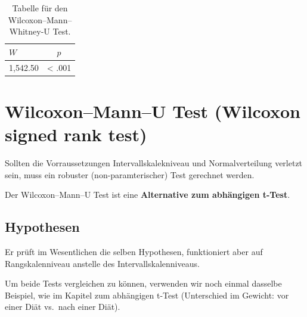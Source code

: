 \documentclass[
]{book}
\newenvironment{Shaded}{\begin{snugshade}}{\end{snugshade}}
\newcommand{\AttributeTok}[1]{\textcolor[rgb]{0.77,0.63,0.00}{#1}}
\newcommand{\FunctionTok}[1]{\textcolor[rgb]{0.00,0.00,0.00}{#1}}
\newcommand{\NormalTok}[1]{#1}
\newcommand{\SpecialCharTok}[1]{\textcolor[rgb]{0.00,0.00,0.00}{#1}}
\newcommand{\StringTok}[1]{\textcolor[rgb]{0.31,0.60,0.02}{#1}}
\begin{document}
\begin{Shaded}
\end{Shaded}

\begin{table}[tbp]

\begin{center}
\begin{threeparttable}

\caption{\label{tab:unnamed-chunk-272}Tabelle für den Wilcoxon–Mann–Whitney-U Test.}

\begin{tabular}{ll}
\toprule
$W$ & \multicolumn{1}{c}{$p$}\\
\midrule
1,542.50 & < .001\\
\bottomrule
\end{tabular}

\end{threeparttable}
\end{center}

\end{table}

\hypertarget{wilcoxonmannu-test-wilcoxon-signed-rank-test}{%
\section{Wilcoxon--Mann--U Test (Wilcoxon signed rank test)}\label{wilcoxonmannu-test-wilcoxon-signed-rank-test}}

Sollten die Vorraussetzungen Intervallskalekniveau und Normalverteilung verletzt sein, muss ein robuster (non-paramterischer) Test gerechnet werden.

Der Wilcoxon--Mann--U Test ist eine \textbf{Alternative zum abhängigen t-Test}.

\hypertarget{hypothesen-5}{%
\subsection{Hypothesen}\label{hypothesen-5}}

Er prüft im Wesentlichen die selben Hypothesen, funktioniert aber auf Rangskalenniveau anstelle des Intervallskalenniveaus.

Um beide Tests vergleichen zu können, verwenden wir noch einmal dasselbe Beispiel, wie im Kapitel zum abhängigen t-Test (Unterschied im Gewicht: vor einer Diät vs.~nach einer Diät).
\end{document}
